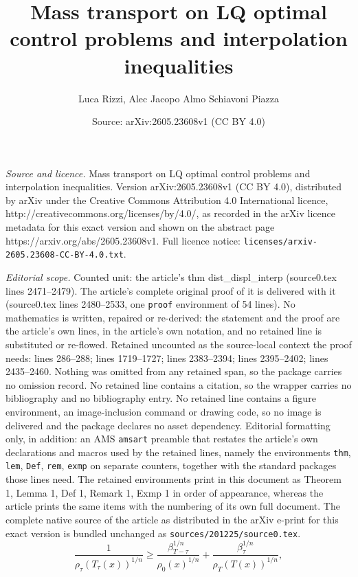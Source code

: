 \documentclass[10pt,a4paper]{amsart}
\title{Mass transport on LQ optimal control problems and interpolation inequalities}
\author{Luca Rizzi, Alec Jacopo Almo Schiavoni Piazza}
\date{Source: arXiv:2605.23608v1 (CC BY 4.0)}
\begin{document}
\maketitle

\noindent\emph{Source and licence.} Mass transport on LQ optimal control problems and interpolation inequalities. Version arXiv:2605.23608v1 (CC BY 4.0), distributed by arXiv under the Creative Commons Attribution 4.0 International licence, http://creativecommons.org/licenses/by/4.0/, as recorded in the arXiv licence metadata for this exact version and shown on the abstract page https://arxiv.org/abs/2605.23608v1. Full licence notice: \texttt{licenses/arxiv-2605.23608-CC-BY-4.0.txt}.\par\smallskip

\noindent\textit{Editorial scope.} Counted unit: the article's thm dist\_displ\_interp (source0.tex lines 2471--2479). The article's complete original proof of it is delivered with it (source0.tex lines 2480--2533, one \texttt{proof} environment of 54 lines). No mathematics is written, repaired or re-derived: the statement and the proof are the article's own lines, in the article's own notation, and no retained line is substituted or re-flowed.  Retained uncounted as the source-local context the proof needs: lines 286--288; lines 1719--1727; lines 2383--2394; lines 2395--2402; lines 2435--2460.  Nothing was omitted from any retained span, so the package carries no omission record.  No retained line contains a citation, so the wrapper carries no bibliography and no bibliography entry.  No retained line contains a figure environment, an image-inclusion command or drawing code, so no image is delivered and the package declares no asset dependency.  Editorial formatting only, in addition: an AMS \texttt{amsart} preamble that restates the article's own declarations and macros used by the retained lines, namely the environments \texttt{thm}, \texttt{lem}, \texttt{Def}, \texttt{rem}, \texttt{exmp} on separate counters, together with the standard packages those lines need.  The retained environments print in this document as Theorem 1, Lemma 1, Def 1, Remark 1, Exmp 1 in order of appearance, whereas the article prints the same items with the numbering of its own full document.  The complete native source of the article as distributed in the arXiv e-print for this exact version is bundled unchanged as \texttt{sources/201225/source0.tex}.
			\begin{equation}\label{density_interpolation_inequality_formula_intro}
				\frac{1}{\rho_\tau(T_\tau(x))^{1/n}}\geq\frac{\beta_{T-\tau}^{1/n}}{\rho_0(x)^{1/n}} +\frac{\beta_{\tau}^{1/n}}{\rho_T(T(x))^{1/n}},
			\end{equation}
\end{document}
